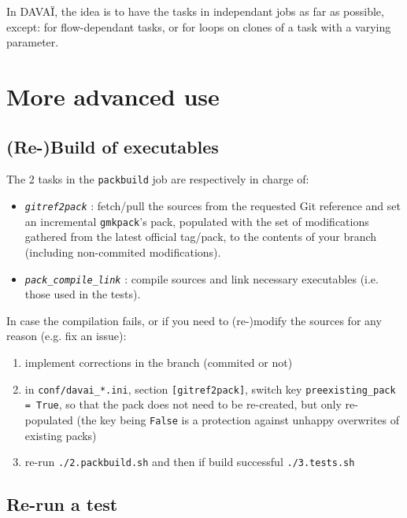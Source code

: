 \documentclass[a4paper,10pt,twoside]{article}
\begin{document}
In DAVAÏ, the idea is to have the tasks in independant jobs as far as possible, except: for flow-dependant tasks, or for loops on clones of a task with a varying parameter.








\newpage
\section{More advanced use\label{sect:options}}

\subsection{(Re-)Build of executables}
The 2 tasks in the \texttt{packbuild} job are respectively in charge of:
\begin{itemize}
 \item \texttt{\textit{gitref2pack}} : fetch/pull the sources from the requested Git reference and set an incremental \texttt{gmkpack}'s pack, populated with the set of modifications gathered from the latest official tag/pack, to the contents of your branch (including non-commited modifications).
 \item \texttt{\textit{pack\_compile\_link}} : compile sources and link necessary executables (i.e. those used in the tests).
\end{itemize}

\noindent In case the compilation fails, or if you need to (re-)modify the sources for any reason (e.g. fix an issue):
\begin{enumerate}[label=\arabic*.]
  \item implement corrections in the branch (commited or not)
  \item in \texttt{conf/davai\_*.ini}, section \texttt{[gitref2pack]}, switch key \texttt{preexisting\_pack = True}, so that the pack does not need to be re-created, but only re-populated (the key being \texttt{False} is a protection against unhappy overwrites of existing packs)
  \item re-run \texttt{./2.packbuild.sh} and then if build successful \texttt{./3.tests.sh}
 \end{enumerate}


\subsection{Re-run a test}
\end{document}
